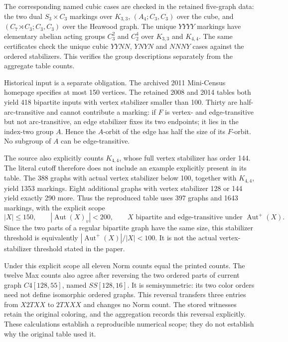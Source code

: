 \documentclass[11pt]{article}
\theoremstyle{definition}\newtheorem{definition}[theorem]{Definition}
\newcommand{\Aut}{\operatorname{Aut}}
\begin{document}
The corresponding named cubic cases are checked in the retained
five-graph data: the two dual $S_3\times C_3$ markings over
$K_{3,3}$, $(A_4;C_3,C_3)$ over the cube, and
$(C_7\rtimes C_3;C_3,C_3)$ over the Heawood graph.  The unique
$YYYY$ markings have elementary abelian acting groups $C_3^2$
and $C_2^4$ over $K_{3,3}$ and $K_{4,4}$.  The same certificates
check the unique cubic $YYNN$, $YNYN$ and $NNNY$ cases against
the ordered stabilizers.  This verifies the group descriptions
separately from the aggregate table counts.

Historical input is a separate obligation.  The archived 2011
Mini-Census homepage specifies at most 150 vertices.  The retained
2008 and 2014 tables both yield 418 bipartite inputs with vertex
stabilizer smaller than 100.  Thirty are half-arc-transitive and
cannot contribute a marking: if $F$ is vertex- and edge-transitive
but not arc-transitive, an edge stabilizer fixes its two endpoints;
it lies in the index-two group $A$.  Hence the $A$-orbit of the edge
has half the size of its $F$-orbit.  No subgroup of $A$ can be
edge-transitive.

The source also explicitly counts $K_{4,4}$, whose full vertex
stabilizer has order 144.  The literal cutoff therefore does not
include an example explicitly present in its table.  The 388 graphs
with actual vertex stabilizer below 100, together with $K_{4,4}$,
yield 1353 markings.  Eight additional graphs with vertex stabilizer
128 or 144 yield exactly 290 more.  Thus the reproduced table uses
397 graphs and 1643 markings, with the explicit scope
\[
 |X|\le150,\qquad |\Aut(X)_v|<200,
 \qquad X\text{ bipartite and edge-transitive under }\Aut^+(X).
\]
Since the two parts of a regular bipartite graph have the same size,
this stabilizer threshold is equivalently
$|\Aut^+(X)|/|X|<100$.  It is not the actual vertex-stabilizer
threshold stated in the paper.

Under this explicit scope all eleven Norm counts equal the printed
counts.  The twelve Max counts also agree after reversing the two
ordered parts of current graph $C4[128,55]$, named $SS[128,16]$.
It is semisymmetric: its two color orders need not define isomorphic
ordered graphs.  This reversal transfers three entries from $X2TXX$
to $2TXXX$ and changes no Norm count.  The stored witnesses retain
the original coloring, and the aggregation records this reversal
explicitly.  These calculations establish a reproducible numerical
scope; they do not establish why the original table used it.
\end{document}
